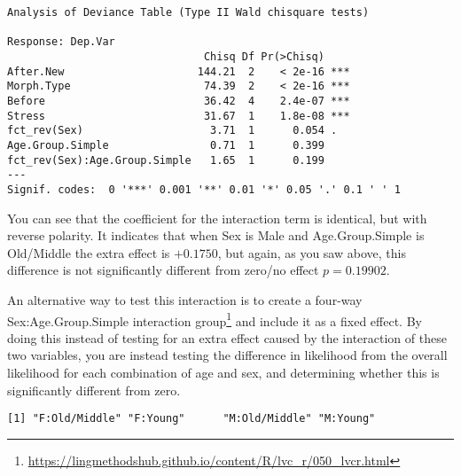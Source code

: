 \documentclass[
  10pt,
  letterpaper]{article}
\newenvironment{Shaded}{\begin{snugshade}}{\end{snugshade}}
\newcommand{\AttributeTok}[1]{\textcolor[rgb]{0.40,0.45,0.13}{#1}}
\newcommand{\CommentTok}[1]{\textcolor[rgb]{0.37,0.37,0.37}{#1}}
\newcommand{\ConstantTok}[1]{\textcolor[rgb]{0.56,0.35,0.01}{#1}}
\newcommand{\FunctionTok}[1]{\textcolor[rgb]{0.28,0.35,0.67}{#1}}
\newcommand{\NormalTok}[1]{\textcolor[rgb]{0.00,0.23,0.31}{#1}}
\newcommand{\OtherTok}[1]{\textcolor[rgb]{0.00,0.23,0.31}{#1}}
\newcommand{\SpecialCharTok}[1]{\textcolor[rgb]{0.37,0.37,0.37}{#1}}
\newcommand{\StringTok}[1]{\textcolor[rgb]{0.13,0.47,0.30}{#1}}
\renewcommand\texttt[1]{{\ttfamily\color{BrickRed}#1}}
\DeclareRobustCommand{\href}[2]{#2\footnote{\url{#1}}}
\begin{document}
\begin{verbatim}
Analysis of Deviance Table (Type II Wald chisquare tests)

Response: Dep.Var
                               Chisq Df Pr(>Chisq)    
After.New                     144.21  2    < 2e-16 ***
Morph.Type                     74.39  2    < 2e-16 ***
Before                         36.42  4    2.4e-07 ***
Stress                         31.67  1    1.8e-08 ***
fct_rev(Sex)                    3.71  1      0.054 .  
Age.Group.Simple                0.71  1      0.399    
fct_rev(Sex):Age.Group.Simple   1.65  1      0.199    
---
Signif. codes:  0 '***' 0.001 '**' 0.01 '*' 0.05 '.' 0.1 ' ' 1
\end{verbatim}

You can see that the coefficient for the interaction term is identical,
but with reverse polarity. It indicates that when \texttt{Sex} is
\texttt{Male} and \texttt{Age.Group.Simple} is \texttt{Old/Middle} the
extra effect is \(+0.1750\), but again, as you saw above, this
difference is not significantly different from zero/no effect
\(p = 0.19902\).

An alternative way to test this interaction is to
\href{https://lingmethodshub.github.io/content/R/lvc_r/050_lvcr.html}{create
a four-way \texttt{Sex:Age.Group.Simple} interaction group} and include
it as a fixed effect. By doing this instead of testing for an extra
effect caused by the interaction of these two variables, you are instead
testing the difference in likelihood from the overall likelihood for
each combination of age and sex, and determining whether this is
significantly different from zero.

\begin{Shaded}
\end{Shaded}

\begin{verbatim}
[1] "F:Old/Middle" "F:Young"      "M:Old/Middle" "M:Young"     
\end{verbatim}
\end{document}
